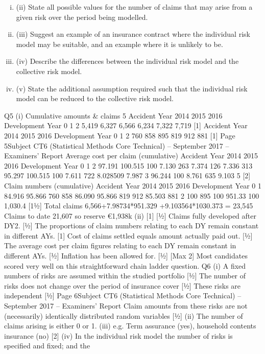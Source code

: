 \documentclass[a4paper,12pt]{article}
\begin{document}
\begin{enumerate}
\begin{enumerate}[(i)]
\item (ii) State all possible values for the number of claims that may arise from a given
risk over the period being modelled.
\item 
(iii) Suggest an example of an insurance contract where the individual risk model
may be suitable, and an example where it is unlikely to be.
\item 
(iv) Describe the differences between the individual risk model and the collective
risk model.
\item 
(v) State the additional assumption required such that the individual risk model
can be reduced to the collective risk model.
\end{enumerate}
Q5
(i)
Cumulative amounts & claims
5
Accident Year
2014
2015
2016
Development Year
0
1
2
5,419 6,327 6,566
6,234 7,322
7,719
[1]
Accident Year
2014
2015
2016
Development Year
0
1
2
760
858
895
819
912
881
[1]
Page 5Subject CT6 (Statistical Methods Core Technical) – September 2017 – Examiners’ Report
Average cost per claim (cumulative)
Accident Year
2014
2015
2016
Development Year
0
1
2
97.191%
100.515%
100%
7.130 263
7.374 126
7.336 313
95.297%
100.515%
100%
7.611 722
8.028509
7.987 3
96.244%
100%
8.761 635
9.103 5
[2]
Claim numbers (cumulative)
Accident Year
2014
2015
2016
Development Year
0
1
84.916%
95.866%
760
858
86.090%
95.866%
819
912
85.503%
881
2
100%
895
100%
951.33
100%
1,030.4
[11⁄2]
Total claims 6,566+7.98734*951.329 +9.103564*1030.373 = 23,545
Claims to date 21,607 so reserve €1,938k
(ii)
[1]
[1⁄2]
Claims fully developed after DY2.
[1⁄2]
The proportions of claim numbers relating to each DY remain constant in
different AYs.
[1]
Cost of claims settled equals amount actually paid out.
[1⁄2]
The average cost per claim figures relating to each DY remain constant in
different AYs.
[1⁄2]
Inflation has been allowed for.
[1⁄2]
[Max 2]
Most candidates scored very well on this straightforward chain ladder
question.
Q6
(i)
A fixed numbers of risks are assumed within the studied portfolio [1⁄2]
The number of risks does not change over the period of insurance cover [1⁄2]
These risks are independent [1⁄2]
Page 6Subject CT6 (Statistical Methods Core Technical) – September 2017 – Examiners’ Report
Claim amounts from these risks are not (necessarily) identically distributed
random variables
[1⁄2]
(ii) The number of claims arising is either 0 or 1. 
(iii) e.g. Term assurance (yes), household contents insurance (no) [2]
(iv) In the individual risk model the number of risks is specified and fixed; and the

\end{enumerate}
\end{document}
